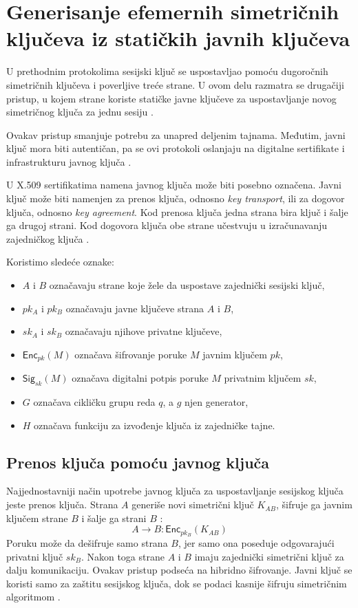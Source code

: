 \section{Generisanje efemernih simetričnih ključeva iz statičkih javnih ključeva}

U prethodnim protokolima sesijski ključ se uspostavljao pomoću dugoročnih simetričnih ključeva i poverljive treće strane. U ovom delu razmatra se drugačiji pristup, u kojem strane koriste statičke javne ključeve za uspostavljanje novog simetričnog ključa za jednu sesiju \cite{smart2016cryptography}.

Ovakav pristup smanjuje potrebu za unapred deljenim tajnama. Međutim, javni ključ mora biti autentičan, pa se ovi protokoli oslanjaju na digitalne sertifikate i infrastrukturu javnog ključa \cite{smart2016cryptography,rfc5280}.

U X.509 sertifikatima namena javnog ključa može biti posebno označena. Javni ključ može biti namenjen za prenos ključa, odnosno \emph{key transport}, ili za dogovor ključa, odnosno \emph{key agreement}. Kod prenosa ključa jedna strana bira ključ i šalje ga drugoj strani. Kod dogovora ključa obe strane učestvuju u izračunavanju zajedničkog ključa \cite{smart2016cryptography,rfc5280}.

Koristimo sledeće oznake:
\begin{itemize}
\item \(A\) i \(B\) označavaju strane koje žele da uspostave zajednički sesijski ključ,
\item \(pk_A\) i \(pk_B\) označavaju javne ključeve strana \(A\) i \(B\),
\item \(sk_A\) i \(sk_B\) označavaju njihove privatne ključeve,
\item \(\mathsf{Enc}_{pk}(M)\) označava šifrovanje poruke \(M\) javnim ključem \(pk\),
\item \(\mathsf{Sig}_{sk}(M)\) označava digitalni potpis poruke \(M\) privatnim ključem \(sk\),
\item \(G\) označava cikličku grupu reda \(q\), a \(g\) njen generator,
\item \(H\) označava funkciju za izvođenje ključa iz zajedničke tajne.
\end{itemize}

\subsection{Prenos ključa pomoću javnog ključa}

Najjednostavniji način upotrebe javnog ključa za uspostavljanje sesijskog ključa jeste prenos ključa. Strana \(A\) generiše novi simetrični ključ \(K_{AB}\), šifruje ga javnim ključem strane \(B\) i šalje ga strani \(B\) \cite{smart2016cryptography}:
\[
A \rightarrow B : \mathsf{Enc}_{pk_B}(K_{AB})
\]
Poruku može da dešifruje samo strana \(B\), jer samo ona poseduje odgovarajući privatni ključ \(sk_B\). Nakon toga strane \(A\) i \(B\) imaju zajednički simetrični ključ za dalju komunikaciju. Ovakav pristup podseća na hibridno šifrovanje. Javni ključ se koristi samo za zaštitu sesijskog ključa, dok se podaci kasnije šifruju simetričnim algoritmom \cite{smart2016cryptography,stallings2011cryptography}.


